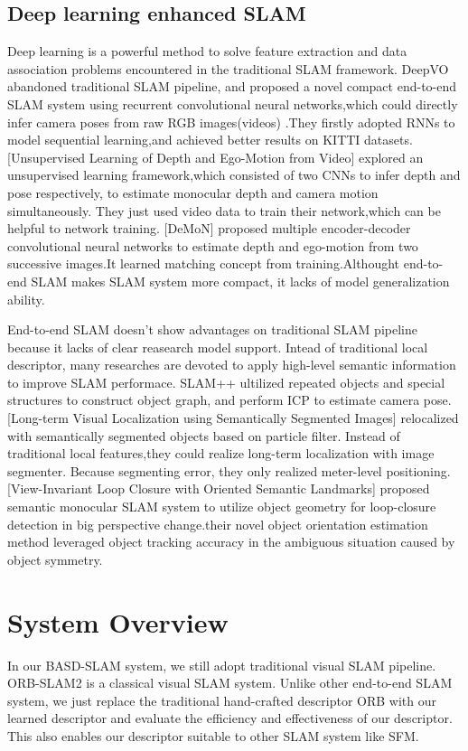 \documentclass{svproc}
\begin{document}
\subsection{Deep learning enhanced SLAM}
Deep learning is a powerful method to solve feature extraction and data association problems encountered in the traditional SLAM framework. 
DeepVO \cite{c19}abandoned traditional SLAM pipeline, and proposed a novel compact end-to-end SLAM system using recurrent convolutional neural networks,which could directly infer camera poses from raw RGB images(videos) .They firstly adopted RNNs to model sequential learning,and achieved better results on KITTI datasets. 
[Unsupervised Learning of Depth and Ego-Motion from Video]\cite{c20} explored an unsupervised learning framework,which consisted of two CNNs to infer depth and pose respectively, to estimate monocular depth and camera motion simultaneously. They just used video data to train their network,which can be helpful to network training.
[DeMoN]\cite{c21} proposed multiple encoder-decoder convolutional neural networks to estimate depth and ego-motion from two successive images.It learned matching concept from training.Althought end-to-end SLAM makes SLAM system more compact, it lacks of model generalization ability.

End-to-end SLAM doesn't show advantages on traditional SLAM pipeline because it lacks of clear reasearch model support. Intead of traditional local descriptor, many researches are devoted to apply high-level semantic information to improve SLAM performace. 
SLAM++ \cite{c22}ultilized repeated objects and special structures to construct object graph, and perform ICP to estimate camera pose.  
[Long-term Visual Localization using Semantically Segmented Images] \cite{c23}relocalized with semantically segmented objects based on particle filter. Instead of traditional local features,they could realize long-term localization with image segmenter. Because segmenting error, they only realized meter-level positioning.  
[View-Invariant Loop Closure with Oriented Semantic Landmarks] \cite{c24}proposed semantic monocular SLAM system  to utilize object geometry for loop-closure detection in big perspective change.their novel object orientation estimation method  leveraged object tracking accuracy in the ambiguous situation caused by object symmetry.



\section{System Overview}
In our BASD-SLAM system, we still adopt traditional visual SLAM pipeline. ORB-SLAM2 \cite{c25}is a classical visual SLAM system. Unlike other end-to-end SLAM system, we just replace the traditional hand-crafted descriptor ORB with our learned descriptor and evaluate the efficiency and effectiveness of our descriptor. This also enables our descriptor suitable to other SLAM system like SFM.
\end{document}
